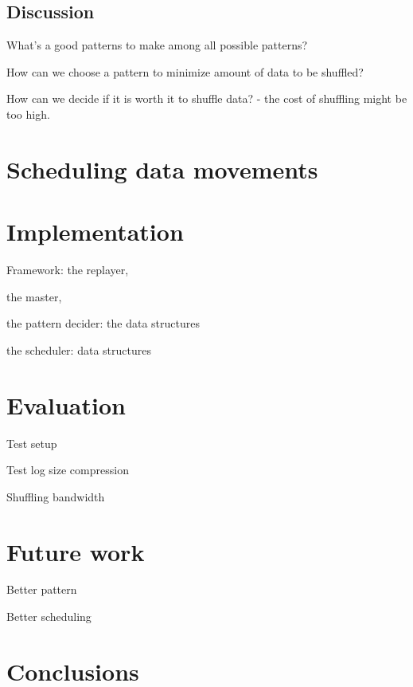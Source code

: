 \documentclass{acm_proc_article-sp}
\begin{document}
\subsection{Discussion}
What's a good patterns to make among 
all possible patterns?

How can we choose a pattern to minimize
amount of data to be shuffled?

How can we decide if it is worth it to
shuffle data? - the cost of shuffling might be
too high.




\section{Scheduling data movements}
\label{sec:scheduling-data-movements}


\section{Implementation}
\label{sec:implementation}

Framework: 
the replayer, 

the master, 

the pattern decider: the data structures

the scheduler: data structures


\section{Evaluation}
\label{sec:evaluation}
Test setup

Test log size compression

Shuffling bandwidth


\section{Future work}
\label{sec:future-work}
Better pattern

Better scheduling


\section{Conclusions}
\label{sec:conclusions}






  
\end{document}
